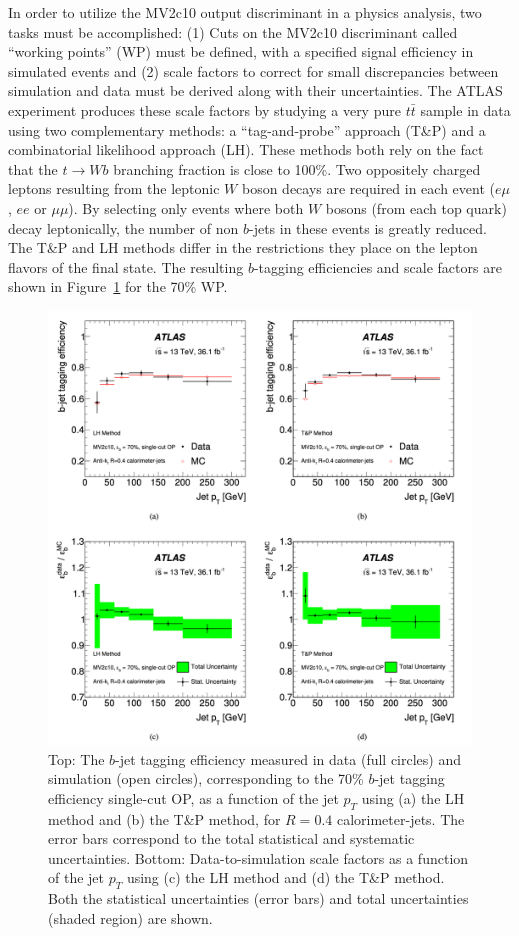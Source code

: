 In order to utilize the MV2c10 output discriminant in a physics analysis, two tasks must be accomplished: (1) Cuts on the MV2c10 discriminant called ``working points'' (WP) must be defined, with a specified signal efficiency in simulated events and (2) scale factors to correct for small discrepancies between simulation and data must be derived along with their uncertainties.
The ATLAS experiment produces these scale factors by studying a very pure $t\bar{t}$ sample in data using two complementary methods: a ``tag-and-probe'' approach (T\&P) and a combinatorial likelihood approach (LH).
These methods both rely on the fact that the $t \rightarrow Wb$ branching fraction is close to 100\%.
Two oppositely charged leptons resulting from the leptonic $W$ boson decays are required in each event ($e\mu$, $ee$ or $\mu\mu$).
By selecting only events where both $W$ bosons (from each top quark) decay leptonically, the number of non $b$-jets in these events is greatly reduced. The T\&P and LH methods differ in the restrictions they place on the lepton flavors of the final state. The resulting $b$-tagging efficiencies and scale factors are shown in Figure~\ref{fig:b_tagging_eff_sf} for the 70\% WP.

\begin{figure}
	\centering
	\includegraphics[width=\textwidth]{b_tagging_eff_sf}
	\caption{
	Top: The $b$-jet tagging efficiency measured in data (full circles) and simulation (open circles), corresponding to the 70\% $b$-jet tagging efficiency single-cut OP, as a function of the jet $p_T$ using (a) the LH method and (b) the T\&P method, for $R = 0.4$ calorimeter-jets. The error bars correspond to the total statistical and systematic uncertainties. Bottom: Data-to-simulation scale factors as a function of the jet $p_T$ using (c) the LH method and (d) the T\&P method. Both the statistical uncertainties (error bars) and total uncertainties (shaded region) are shown.
    \cite{Aaboud:2018xwy}
	}
	\label{fig:b_tagging_eff_sf}
\end{figure}
